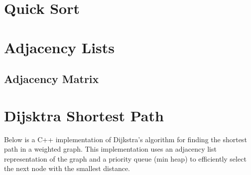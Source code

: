 \documentclass[openany]{report}
\begin{document}
\section{Quick Sort}


\section{Adjacency Lists}

\subsection{Adjacency Matrix}




\section{Dijsktra Shortest Path}

Below is a C++ implementation of Dijkstra's algorithm for finding the shortest path in a weighted graph.
This implementation uses an adjacency list representation of the graph
and a priority queue (min heap) to efficiently select the next node with the smallest distance.
\end{document}
